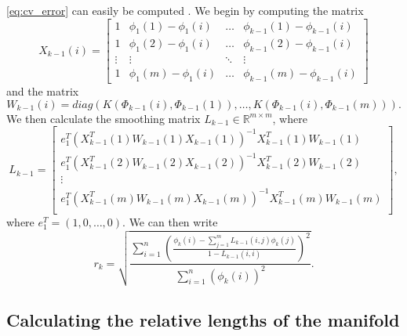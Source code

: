 \documentclass[preprint]{elsarticle}
\begin{document}
\eqref{eq:cv_error} can easily be computed \cite{wasserman2006all}.
%
We begin by computing the matrix
\begin{equation}
X_{k-1}(i) = \begin{bmatrix}
1 & \phi_1(1) - \phi_1(i) & \dots & \phi_{k-1}(1)- \phi_{k-1}(i) \\
1 & \phi_1(2) - \phi_1(i) & \dots & \phi_{k-1}(2)- \phi_{k-1}(i) \\
\vdots & \vdots & \ddots & \vdots \\
1 & \phi_1(m) - \phi_1(i) & \dots & \phi_{k-1}(m)- \phi_{k-1}(i) 
\end{bmatrix}
\end{equation}
%
and the matrix 
\begin{equation}
W_{k-1}(i) = diag \left( K(\Phi_{k-1}(i), \Phi_{k-1}(1)), \dots, K(\Phi_{k-1}(i), \Phi_{k-1}(m)) \right).
\end{equation}
%
We then calculate the smoothing matrix $L_{k-1} \in \mathbb{R}^{m \times m}$, where 
\begin{equation}
L_{k-1} =
\begin{bmatrix}
e_1^T \left( X_{k-1}^T(1) W_{k-1}(1) X_{k-1}(1) \right) ^{-1} X_{k-1}^T(1) W_{k-1}(1) \\
e_1^T \left( X_{k-1}^T(2) W_{k-1}(2) X_{k-1}(2) \right) ^{-1} X_{k-1}^T(2) W_{k-1}(2) \\
\vdots \\
e_1^T \left( X_{k-1}^T(m) W_{k-1}(m) X_{k-1}(m) \right) ^{-1} X_{k-1}^T(m) W_{k-1}(m) \\
\end{bmatrix},
\end{equation}
%
where $e_1^T = (1, 0, \dots, 0)$. 
%
We can then write
%
\begin{equation} 
r_{k} = \sqrt{ \frac{\sum_{i=1}^n \left( \frac{ \phi_{k} (i) - \sum_{j=1}^m L_{k-1}(i,j) \phi_{k}(j) }{1-L_{k-1}(i,i)} \right)^2} {\sum_{i=1}^n  \left( \phi_{k} (i) \right)^2 }} .
\end{equation}

\subsection{Calculating the relative lengths of the manifold} \label{sec:relative_lengths}
\end{document}
